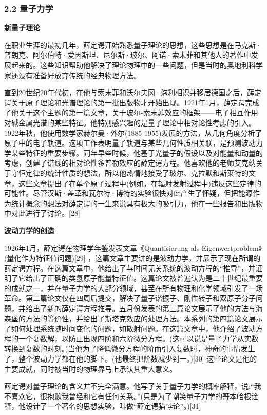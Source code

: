 \subsubsection{2.2 量子力学}
\textbf{新量子理论}

在职业生涯的最初几年，薛定谔开始熟悉量子理论的思想，这些思想是在马克斯·普朗克、阿尔伯特·爱因斯坦、尼尔斯·玻尔、阿诺·索末菲和其他人的著作中发展起来的。这些知识帮助他解决了理论物理中的一些问题，但是当时的奥地利科学家还没有准备好放弃传统的经典物理方法。

直到20世纪20年代初，在他与索末菲和沃尔夫冈·泡利相识并移居德国之后，薛定谔关于原子理论和光谱理论的第一批出版物才开始出现。1921年1月，薛定谔完成了他关于这个主题的第一篇文章，关于玻尔-索末菲效应的框架——电子相互作用对碱金属光谱的某些特征。他特别感兴趣的是量子理论中相对论性考虑的引入。1922年秋，他使用数学家赫尔曼·外尔(1885-1955)发展的方法，从几何角度分析了原子中的电子轨道。这项工作表明量子轨道与某些几何性质相关联，是预测波动力学某些特征的重要步骤。同年早些时候，他基于光量子的假设以及对能量和动量的考虑，创建了谱线的相对论性多普勒效应的薛定谔方程。他喜欢他的老师艾克纳关于守恒定律的统计性质的想法，所以他热情地接受了玻尔、克拉默和斯莱特的文章，这些文章提出了在单个原子过程中(例如，在辐射发射过程中)违反这些定律的可能性。尽管汉斯·盖革和瓦尔特·博特的实验很快对此产生了怀疑，但把能源作为统计概念的想法对薛定谔的一生来说具有极大的吸引力，他在一些报告和出版物中对此进行了讨论。[28]

\textbf{波动力学的创造}

1926年1月，薛定谔在物理学年鉴发表文章《Quantisierung als Eigenwertproblem》(量化作为特征值问题)[29] ，这篇文章主要讲的是波动力学，并展示了现在所谓的薛定谔方程。在这篇文章中，他给出了与时间无关系统的波动方程的“推导”，并证明了它给出了正确的类氢原子能量特征值。这篇论文被普遍认为是二十世纪最重要的成就之一，并在量子力学的大部分领域，甚至在所有物理和化学领域引发了一场革命。第二篇论文仅在四周后提交，解决了量子谐振子、刚性转子和双原子分子问题，并给出了新的薛定谔方程推导。五月份发表的第三篇论文展示了他的方法与海森堡的方法的等价性，并给出了斯塔克效应的处理方法。本系列的第四篇论文展示了如何处理系统随时间变化的问题，如散射问题。在这篇文章中，他介绍了波动方程的一个复数解，以防止出现四阶和六阶微分方程。(这可以说是量子力学从实数转换到复数的时刻。)当他为了降低微分方程的阶而引入复数时，神奇的事情发生了，整个波动力学都在他的脚下。(他最终把阶数减少到一。)[30] 这些论文是他的主要成就，同时被当时的物理界马上承认其重大意义。

薛定谔对量子理论的含义并不完全满意。他写了关于量子力学的概率解释，说:“我不喜欢它，很抱歉我曾经和它有任何关系。”(只是为了嘲笑量子力学的哥本哈根诠释，他设计了一个著名的思想实验，叫做“薛定谔猫悖论”。)[31]

